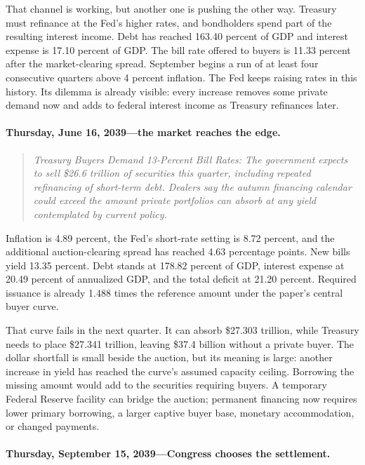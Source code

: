 \documentclass[11pt]{article}
\begin{document}
That channel is working, but another one is pushing the other way.  Treasury must refinance
at the Fed's higher rates, and bondholders spend part of the resulting interest income.  Debt
has reached 163.40 percent of GDP and interest expense is 17.10 percent of GDP.  The bill
rate offered to buyers is 11.33 percent after the market-clearing spread.  September
begins a run of at least four consecutive quarters above 4 percent inflation.  The Fed keeps
raising rates in this history.  Its dilemma is already visible: every increase removes some
private demand now and adds to federal interest income as Treasury refinances later.

\paragraph{Thursday, June 16, 2039---the market reaches the edge.}

\begin{quote}
\small\itshape
Treasury Buyers Demand 13-Percent Bill Rates: The government expects to sell \$26.6 trillion
of securities this quarter, including repeated refinancing of short-term debt.  Dealers say
the autumn financing calendar could exceed the amount private portfolios can absorb at any
yield contemplated by current policy.
\end{quote}

Inflation is 4.89 percent, the Fed's short-rate setting is 8.72 percent, and the additional
auction-clearing spread has reached 4.63 percentage points.  New bills yield 13.35 percent.
Debt stands at 178.82 percent of GDP, interest expense at 20.49 percent of annualized GDP,
and the total deficit at 21.20 percent.  Required issuance is already 1.488 times the
reference amount under the paper's central buyer curve.

That curve fails in the next quarter.  It can absorb \$27.303 trillion, while Treasury needs
to place \$27.341 trillion, leaving \$37.4 billion without a private buyer.  The dollar
shortfall is small beside the auction, but its meaning is large: another increase in yield
has reached the curve's assumed capacity ceiling.  Borrowing the missing amount would add to
the securities requiring buyers.  A temporary Federal Reserve facility can bridge the
auction; permanent financing now requires lower primary borrowing, a larger captive buyer
base, monetary accommodation, or changed payments.

\paragraph{Thursday, September 15, 2039---Congress chooses the settlement.}
\end{document}

